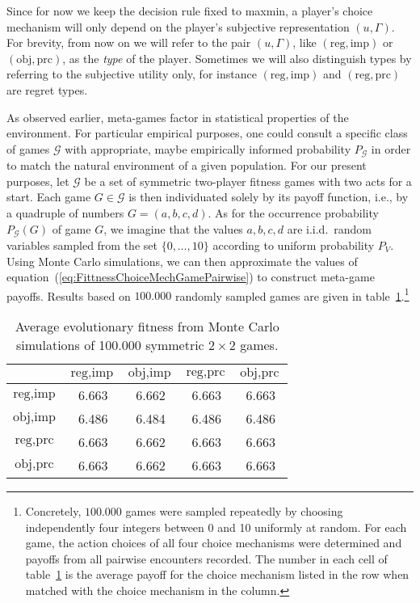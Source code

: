 \documentclass[fleqn,reqno,12pt]{article}
\theoremstyle{Satz}
\theoremstyle{Bsp}
\begin{document}
Since for now we keep the decision rule fixed to maxmin, a player's choice mechanism will only depend on the player's subjective representation $ (u,\Gamma) $. For brevity, from now on we will refer to the pair $ (u,\Gamma)$, like $(\text{reg}, \text{imp})$ or $(\text{obj}, \text{prc})$, as the \textit{type} of the player. Sometimes we will also distinguish types by referring to the subjective utility only, for instance $(\text{reg}, \text{imp})$ and $(\text{reg}, \text{prc})$ are regret types.

As observed earlier, meta-games factor in statistical properties of the environment. For particular
empirical purposes, one could consult a specific class of games $\mathcal{G}$ with appropriate,
maybe empirically informed probability $P_{\mathcal{G}}$ in order to match the natural
environment of a given population. For our present purposes, let $\mathcal{G}$ be a set of symmetric
two-player fitness games with two acts for a start. Each game $G \in \mathcal{G}$ is then individuated solely by its payoff
function, i.e., by a quadruple of numbers $G=(a,b,c,d)$. As for the occurrence probability
$P_{\mathcal{G}}(G)$ of game $G$, we imagine that the values $a,b,c,d$ are i.i.d.~random
variables sampled from the set $ \lbrace 0, \dots, 10 \rbrace$ according to uniform probability
$P_{V}$. Using Monte Carlo simulations, we can then approximate the values of
equation~(\ref{eq:FittnessChoiceMechGamePairwise}) to construct meta-game payoffs. Results
based on $100.000$ randomly sampled games are given in
table~\ref{tab:ExpectedFitness_4Types}.\footnote{Concretely, $100.000$ games were sampled
  repeatedly by choosing independently four integers between 0 and 10 uniformly at random. For
  each game, the action choices of all four choice mechanisms were determined and payoffs from
  all pairwise encounters recorded. The number in each cell of
  table~\ref{tab:ExpectedFitness_4Types} is the average payoff for the choice mechanism listed
  in the row when matched with the choice mechanism in the column.}

\begin{table}[t]
\centering
\begin{tabular}{ccccc}
  \toprule
 & $\text{reg}, \text{imp}$ 
 & $\text{obj}, \text{imp}$ 
 & $\text{reg}, \text{prc}$ 
 & $\text{obj}, \text{prc}$ \\ 
  \midrule
  $\text{reg}, \text{imp}$ & 6.663 & 6.662 & 6.663 & 6.663 \\ 
  $\text{obj}, \text{imp}$ & 6.486 & 6.484 & 6.486 & 6.486 \\ 
  $\text{reg}, \text{prc}$ & 6.663 & 6.662 & 6.663 & 6.663 \\  
  $\text{obj}, \text{prc}$ & 6.663 & 6.662 & 6.663 & 6.663 \\ 
   \bottomrule
\end{tabular}                    
\caption{Average evolutionary fitness from Monte Carlo simulations of 100.000 symmetric $2 \times 2$ games.}
\label{tab:ExpectedFitness_4Types}
\end{table}
\end{document}
